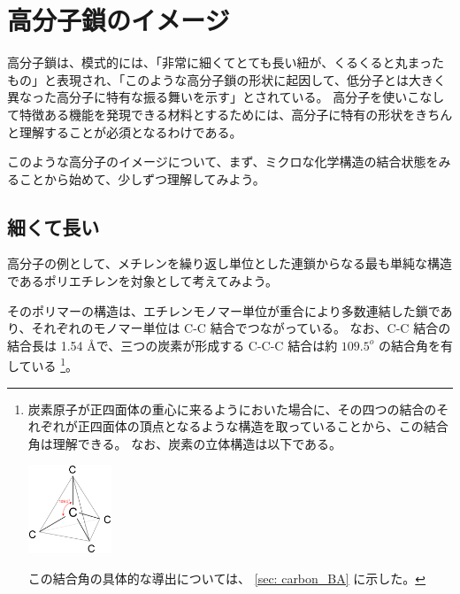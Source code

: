 \documentclass[uplatex,dvipdfmx,a4paper,11pt, titlepage]{jsarticle}
\begin{document}
\section{高分子鎖のイメージ}

高分子鎖は、模式的には、「非常に細くてとても長い紐が、くるくると丸まったもの」と表現され、「このような高分子鎖の形状に起因して、低分子とは大きく異なった高分子に特有な振る舞いを示す」とされている。
高分子を使いこなして特徴ある機能を発現できる材料とするためには、高分子に特有の形状をきちんと理解することが必須となるわけである。

このような高分子のイメージについて、まず、ミクロな化学構造の結合状態をみることから始めて、少しずつ理解してみよう。

\subsection{細くて長い}

高分子の例として、メチレンを繰り返し単位とした連鎖からなる最も単純な構造であるポリエチレンを対象として考えてみよう。

そのポリマーの構造は、エチレンモノマー単位が重合により多数連結した鎖であり、それぞれのモノマー単位は C-C 結合でつながっている。
なお、C-C 結合の結合長は 1.54 \AA で、三つの炭素が形成する C-C-C 結合は約 $109.5^o$ の結合角を有している
\footnote
{
炭素原子が正四面体の重心に来るようにおいた場合に、その四つの結合のそれぞれが正四面体の頂点となるような構造を取っていることから、この結合角は理解できる。
なお、炭素の立体構造は以下である。
\begin{center}
	\includegraphics[width=2.5cm]{figure/carbon.eps}
\end{center}

この結合角の具体的な導出については、 \ref{sec: carbon_BA} に示した。
}。
\end{document}
